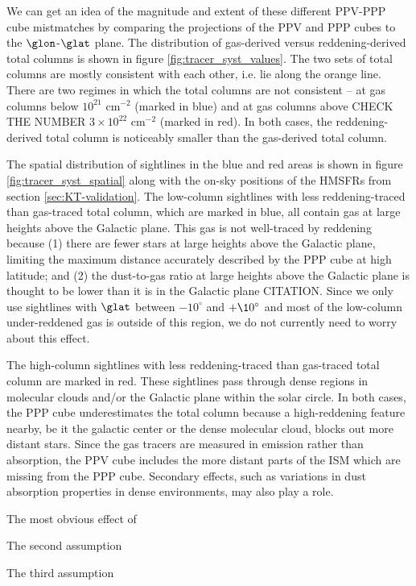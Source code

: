 We can get an idea of the magnitude and extent of these different PPV-PPP cube mistmatches by comparing the projections of the PPV and PPP cubes to the $\glon$-$\glat$ plane. 
The distribution of gas-derived versus reddening-derived total columns is shown in figure \ref{fig:tracer_syst_values}. 
The two sets of total columns are mostly consistent with each other, i.e. lie along the orange line. 
There are two regimes in which the total columns are not consistent -- at gas columns below $10^{21}$ cm$^{-2}$ (marked in  blue) and at gas columns above CHECK THE NUMBER $3 \times 10^{22}$ cm$^{-2}$ (marked in red). 
In both cases, the reddening-derived total column is noticeably smaller than the gas-derived total column.

The spatial distribution of sightlines in the blue and red areas is shown in figure \ref{fig:tracer_syst_spatial} along with the on-sky positions of the HMSFRs from section \ref{sec:KT-validation}. 
The low-column sightlines with less reddening-traced than gas-traced total column, which are marked in blue, all contain gas at large heights above the Galactic plane. 
This gas is not well-traced by reddening because (1) there are fewer stars at large heights above the Galactic plane, limiting the maximum distance accurately described by the PPP cube at high latitude; and (2) the dust-to-gas ratio at large heights above the Galactic plane is thought to be lower than it is in the Galactic plane CITATION. 
Since we only use sightlines with $\glat$ between $-10^\circ$ and $+\10^\circ$ and most of the low-column under-reddened gas is outside of this region, we do not currently need to worry about this effect.

The high-column sightlines with less reddening-traced than gas-traced total column are marked in red.
These sightlines pass through dense regions in molecular clouds and/or the Galactic plane within the solar circle. 
In both cases, the PPP cube underestimates the total column because a high-reddening feature nearby, be it the galactic center or the dense molecular cloud, blocks out more distant stars. 
Since the gas tracers are measured in emission rather than absorption, the PPV cube includes the more distant parts of the ISM which are missing from the PPP cube. 
Secondary effects, such as variations in dust absorption properties in dense environments, may also play a role.

The most obvious effect of 

The second assumption

The third assumption

